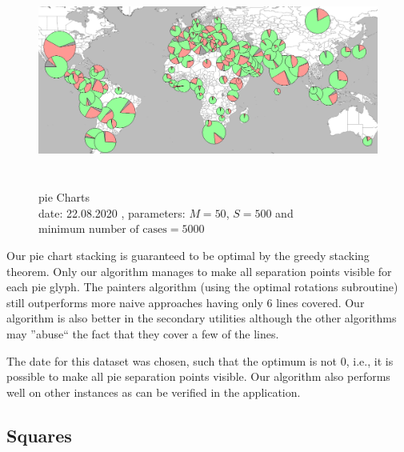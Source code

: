 \documentclass[a4paper,11pt]{article}
\begin{document}
\begin{figure}[!b]
  \centering
  \includegraphics[height=7cm]{assets/pieChartsEval}
  \caption{pie Charts\\
    date: 22.08.2020  , parameters: $M=50$, $S=500$ and $\text{minimum number of cases}=5000$  }
\end{figure}


Our pie chart stacking is guaranteed to be optimal by the greedy stacking theorem. Only our algorithm manages to make all separation points visible for each pie glyph. The painters algorithm (using the optimal rotations subroutine) still outperforms more naive approaches having only 6 lines covered. Our algorithm is also better in the secondary utilities although the other algorithms may ''abuse`` the fact that they cover a few of the lines.

The date for this dataset was chosen, such that the optimum is not $0$, i.e., it is possible to make all pie separation points visible. Our algorithm also performs well on other instances as can be verified in the application.


\subsection*{Squares}
\end{document}
